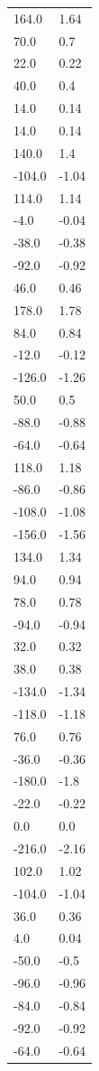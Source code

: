 \begin{longtable}{ll}
164.0 & 1.64 \\
70.0 & 0.7 \\
22.0 & 0.22 \\
40.0 & 0.4 \\
14.0 & 0.14 \\
14.0 & 0.14 \\
140.0 & 1.4 \\
-104.0 & -1.04 \\
114.0 & 1.14 \\
-4.0 & -0.04 \\
-38.0 & -0.38 \\
-92.0 & -0.92 \\
46.0 & 0.46 \\
178.0 & 1.78 \\
84.0 & 0.84 \\
-12.0 & -0.12 \\
-126.0 & -1.26 \\
50.0 & 0.5 \\
-88.0 & -0.88 \\
-64.0 & -0.64 \\
118.0 & 1.18 \\
-86.0 & -0.86 \\
-108.0 & -1.08 \\
-156.0 & -1.56 \\
134.0 & 1.34 \\
94.0 & 0.94 \\
78.0 & 0.78 \\
-94.0 & -0.94 \\
32.0 & 0.32 \\
38.0 & 0.38 \\
-134.0 & -1.34 \\
-118.0 & -1.18 \\
76.0 & 0.76 \\
-36.0 & -0.36 \\
-180.0 & -1.8 \\
-22.0 & -0.22 \\
0.0 & 0.0 \\
-216.0 & -2.16 \\
102.0 & 1.02 \\
-104.0 & -1.04 \\
36.0 & 0.36 \\
4.0 & 0.04 \\
-50.0 & -0.5 \\
-96.0 & -0.96 \\
-84.0 & -0.84 \\
-92.0 & -0.92 \\
-64.0 & -0.64 \\

\end{longtable}
